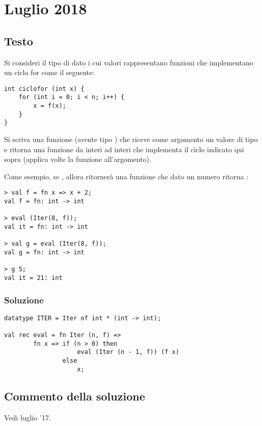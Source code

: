 \section{Luglio 2018}
\subsection{Testo}

Si consideri il tipo di dato  i cui valori  rappresentano funzioni che implementano un ciclo for come il seguente:

\begin{lstlisting}
int ciclofor (int x) {
	for (int i = 0; i < n; i++) {
		x = f(x);
	}
}
\end{lstlisting}

Si scriva una funzione  (avente tipo ) che riceve come argomento un valore di tipo  e ritorna una funzione da interi ad interi che implementa il ciclo indicato qui sopra (applica  volte la funzione  all'argomento).

\medskip
Come esempio, se , allora  ritornerà una funzione che dato un numero  ritorna :

\begin{lstlisting}[style = SML]
> val f = fn x => x + 2;
val f = fn: int -> int

> eval (Iter(8, f));
val it = fn: int -> int

> val g = eval (Iter(8, f));
val g = fn: int -> int

> g 5;
val it = 21: int
\end{lstlisting}

\subsubsection{Soluzione}

\begin{lstlisting}[style = SML, caption = {definizione della funzione \sml{eval}}]
datatype ITER = Iter of int * (int -> int);

val rec eval = fn Iter (n, f) =>
		fn x => if (n > 0) then
					eval (Iter (n - 1, f)) (f x)
				else
					x;
\end{lstlisting}

\subsection{Commento della soluzione}
Vedi luglio '17.